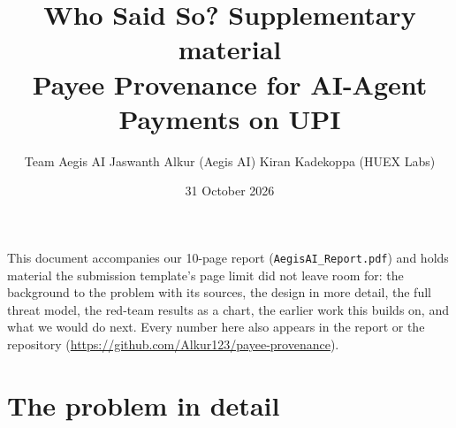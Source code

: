 \documentclass[10pt,a4paper]{article}
\title{\textbf{Who Said So?} Supplementary material\\[2pt]\large Payee Provenance for AI-Agent Payments on UPI}
\author{Team Aegis AI \quad Jaswanth Alkur (Aegis AI) \quad Kiran Kadekoppa (HUEX Labs)}
\date{31 October 2026}
\newcommand{\repo}{\url{https://github.com/Alkur123/payee-provenance}}
\begin{document}
\maketitle
\vspace{-1em}
This document accompanies our 10-page report (\texttt{AegisAI\_Report.pdf}) and holds material the submission template's page limit did not leave room for: the background to the problem with its sources, the design in more detail, the full threat model, the red-team results as a chart, the earlier work this builds on, and what we would do next. Every number here also appears in the report or the repository (\repo{}).

\section{The problem in detail}\label{sec:problem}
\end{document}
